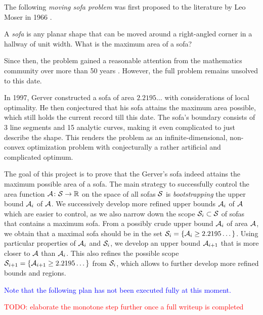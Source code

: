 \maketitle

The following \emph{moving sofa problem} was first proposed to the literature by Leo Moser in 1966 \cite{moser1966problem}.
\begin{problem}
A \emph{sofa} is any planar shape that can be moved around a right-angled corner in a hallway of unit width. What is the maximum area of a sofa? 
\end{problem} 
Since then, the problem gained a reasonable attention from the mathematics community over more than 50 years \cite{gerver1992moving,  romik2018differential, kallus2018improved}. However, the full problem remains unsolved to this date.

In 1997, Gerver \cite{gerver1992moving} constructed a sofa of area $2.2195\dots$ with considerations of local optimality. He then conjectured that his sofa attains the maximum area possible, which still holds the current record till this date.
The sofa's boundary consists of 3 line segments and 15 analytic curves, making it even complicated to just describe the shape.
This renders the problem as an infinite-dimensional, non-convex optimization problem with conjecturally a rather artificial and complicated optimum.

The goal of this project is to prove that the Gerver's sofa indeed attains the maximum possible area of a sofa.
The main strategy to successfully control the area function $\mathcal{A} \colon \mathcal{S} \rightarrow \mathbb{R}$ on the space of all sofas $\mathcal{S}$ is \emph{bootstrapping} the upper bound $\mathcal{A}_i$ of $\mathcal{A}$. 
We successively develop more refined upper bounds $\mathcal{A}_i$ of $\mathcal{A}$ which are easier to control, as we also narrow down the scope $\mathcal{S}_i \subset \mathcal{S}$ of sofas that contains a maximum sofa.
From a possibly crude upper bound $\mathcal{A}_i$ of area $\mathcal{A}$, we obtain that a maximal sofa should be in the set $\mathcal{S}_i = \{\mathcal{A}_i \geq 2.2195\dots \}$. 
Using particular properties of $\mathcal{A}_i$ and $\mathcal{S}_i$, we develop an upper bound $\mathcal{A}_{i+1}$ that is more closer to $\mathcal{A}$ than $\mathcal{A}_i$. 
This also refines the possible scope $\mathcal{S}_{i + 1} = \{\mathcal{A}_{i + 1} \geq 2.2195\dots \}$ from $\mathcal{S}_i$, which allows to further develop more refined bounds and regions.

\textcolor{blue}{Note that the following plan has not been executed fully at this moment.}

\textcolor{red}{TODO: elaborate the monotone step further once a full writeup is completed}

